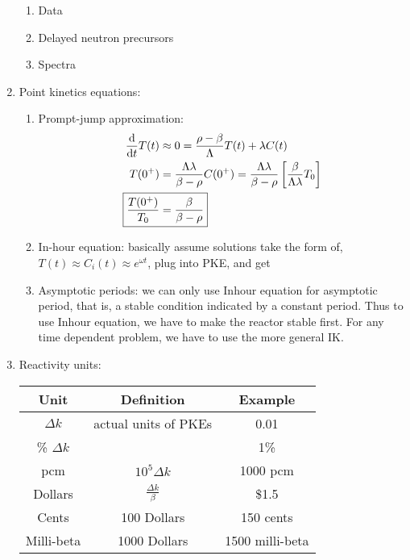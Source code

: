 \documentclass{school-22.211-notes}
\begin{document}
\begin{enumerate}
\begin{enumerate}
    \item Data
    \item Delayed neutron precursors
    \item Spectra
  \end{enumerate}

\item Point kinetics equations: 
  \begin{enumerate}
    \item Prompt-jump approximation: 
      \begin{align}
        \ddt T(t) &\approx 0 = \frac{\rho - \beta}{\Lambda} T(t) + \lambda C(t) \\
        T(0^+) &= \frac{\Lambda \lambda}{\beta - \rho} C(0^+) = \frac{\Lambda \lambda}{\beta - \rho} \left[ \frac{\beta}{\Lambda \lambda} T_0 \right] \\
        \Aboxed{ \frac{T(0^+)}{T_0} &= \frac{\beta}{\beta - \rho} }
      \end{align}
    \item In-hour equation: basically assume solutions take the form of, $T(t) \approx C_i (t) \approx e^{\omega t}$, plug into PKE, and get

    \item Asymptotic periods: we can only use Inhour equation for asymptotic period, that is, a stable condition indicated by a constant period. Thus to use Inhour equation, we have to make the reactor stable first. For any time dependent problem, we have to use the more general IK. 
  \end{enumerate}

\item Reactivity units: 

\begin{table}[ht]
  \centering
  \begin{tabular}{|c|c|c|} \hline
    Unit & Definition & Example \\ \hline
    $\Delta k$ & actual units of PKEs & 0.01 \\
    \% $\Delta k$ & & 1\% \\
    pcm & $10^5 \Delta k $ & 1000 pcm \\ \hline
    Dollars & $\frac{\Delta k}{\beta}$ & \$1.5 \\
    Cents & 100 Dollars & 150 cents \\ 
    Milli-beta & 1000 Dollars & 1500 milli-beta \\ \hline
  \end{tabular}
\end{table}


\end{enumerate}
\end{document}
